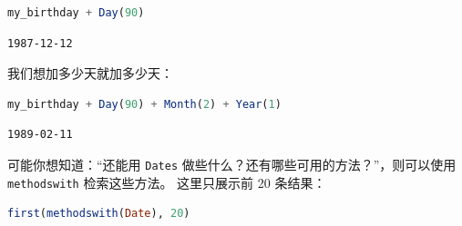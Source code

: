 \documentclass[
  notoc %
]{tufte-book}
\newcommand{\passthrough}[1]{#1}
\begin{document}
\begin{lstlisting}[language=Julia]
my_birthday + Day(90)
\end{lstlisting}

\begin{lstlisting}[language=Output]
1987-12-12
\end{lstlisting}

我们想加多少天就加多少天：

\begin{lstlisting}[language=Julia]
my_birthday + Day(90) + Month(2) + Year(1)
\end{lstlisting}

\begin{lstlisting}[language=Output]
1989-02-11
\end{lstlisting}

可能你想知道：``还能用 \passthrough{\lstinline!Dates!}
做些什么？还有哪些可用的方法？''，则可以使用
\passthrough{\lstinline!methodswith!} 检索这些方法。 这里只展示前 20
条结果：

\begin{lstlisting}[language=Julia]
first(methodswith(Date), 20)
\end{lstlisting}
\end{document}
